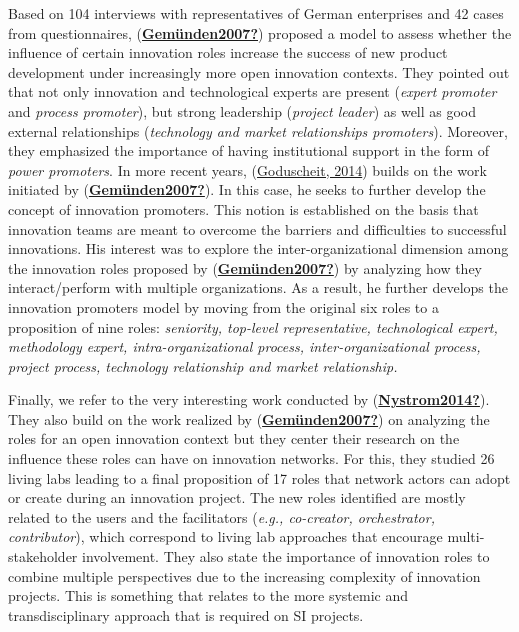 \documentclass[]{elsarticle} %
\begin{document}
Based on 104 interviews with representatives of German enterprises and
42 cases from questionnaires,
(\protect\hyperlink{ref-Gemuxfcnden2007}{\textbf{Gemünden2007?}})
proposed a model to assess whether the influence of certain innovation
roles increase the success of new product development under increasingly
more open innovation contexts. They pointed out that not only innovation
and technological experts are present (\emph{expert promoter} and
\emph{process promoter}), but strong leadership (\emph{project leader})
as well as good external relationships (\emph{technology and market
relationships promoters}). Moreover, they emphasized the importance of
having institutional support in the form of \emph{power promoters}. In
more recent years, (\protect\hyperlink{ref-Goduscheit2014}{Goduscheit,
2014}) builds on the work initiated by
(\protect\hyperlink{ref-Gemuxfcnden2007}{\textbf{Gemünden2007?}}). In
this case, he seeks to further develop the concept of innovation
promoters. This notion is established on the basis that innovation teams
are meant to overcome the barriers and difficulties to successful
innovations. His interest was to explore the inter-organizational
dimension among the innovation roles proposed by
(\protect\hyperlink{ref-Gemuxfcnden2007}{\textbf{Gemünden2007?}}) by
analyzing how they interact/perform with multiple organizations. As a
result, he further develops the innovation promoters model by moving
from the original six roles to a proposition of nine roles:
\emph{seniority, top-level representative, technological expert,
methodology expert, intra-organizational process, inter-organizational
process, project process, technology relationship \emph{and} market
relationship.}

Finally, we refer to the very interesting work conducted by
(\protect\hyperlink{ref-Nystrom2014}{\textbf{Nystrom2014?}}). They also
build on the work realized by
(\protect\hyperlink{ref-Gemuxfcnden2007}{\textbf{Gemünden2007?}}) on
analyzing the roles for an open innovation context but they center their
research on the influence these roles can have on innovation networks.
For this, they studied 26 living labs leading to a final proposition of
17 roles that network actors can adopt or create during an innovation
project. The new roles identified are mostly related to the users and
the facilitators (\emph{e.g., co-creator, orchestrator, contributor}),
which correspond to living lab approaches that encourage
multi-stakeholder involvement. They also state the importance of
innovation roles to combine multiple perspectives due to the increasing
complexity of innovation projects. This is something that relates to the
more systemic and transdisciplinary approach that is required on SI
projects.
\end{document}
